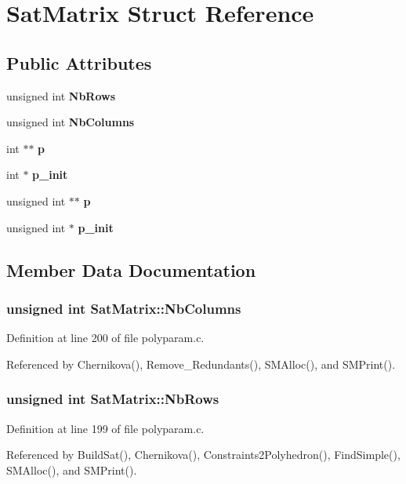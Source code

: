\section{Sat\-Matrix  Struct Reference}
\label{structSatMatrix}
\subsection*{Public Attributes}
\begin{CompactItemize}
\item 
unsigned int {\bf Nb\-Rows}
\item 
unsigned int {\bf Nb\-Columns}
\item 
int $\ast$$\ast$ {\bf p}
\item 
int $\ast$ {\bf p\_\-init}
\item 
unsigned int $\ast$$\ast$ {\bf p}
\item 
unsigned int $\ast$ {\bf p\_\-init}
\end{CompactItemize}


\subsection{Member Data Documentation}
\subsubsection{\setlength{\rightskip}{0pt plus 5cm}unsigned int Sat\-Matrix::Nb\-Columns}\label{structSatMatrix_m1}




Definition at line 200 of file polyparam.c.

Referenced by Chernikova(), Remove\_\-Redundants(), SMAlloc(), and SMPrint().

\subsubsection{\setlength{\rightskip}{0pt plus 5cm}unsigned int Sat\-Matrix::Nb\-Rows}\label{structSatMatrix_m0}




Definition at line 199 of file polyparam.c.

Referenced by Build\-Sat(), Chernikova(), Constraints2Polyhedron(), Find\-Simple(), SMAlloc(), and SMPrint().

